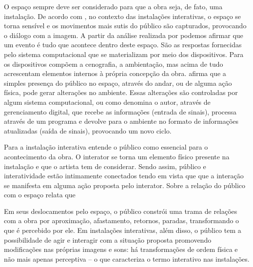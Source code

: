 O espaço sempre deve ser considerado para que a obra seja, de fato, uma instalação. De acordo com , no contexto das instalações interativas, o espaço se torna sensível e os movimentos mais sutis do público são capturados, provocando o diálogo com a imagem. A partir da análise realizada por  podemos afirmar que um evento é tudo que acontece dentro deste espaço. São as respostas fornecidas pelo sistema computacional que se materializam por meio dos dispositivos. Para  os dispositivos compõem a cenografia, a
ambientação, mas acima de tudo acrescentam elementos internos à própria concepção
da obra.  afirma que a simples presença do público no espaço, através do andar, ou de alguma ação física, pode gerar alterações no ambiente. Essas alterações são controladas por algum sistema computacional, ou como denomina o autor, através de gerenciamento digital, que recebe as informações (entrada de sinais), processa através de um programa e devolve para o ambiente no formato de informações atualizadas (saída de sinais), provocando um novo ciclo.

Para  a instalação interativa entende o público como essencial para o acontecimento da obra. O interator se torna um elemento físico presente na instalação e que o artista tem de considerar. Sendo assim, público e interatividade estão intimamente conectados tendo em vista que que a interação se manifesta em alguma ação proposta pelo interator. Sobre a relação do público com o espaço  relata que

\begin{citacao}
Em seus deslocamentos pelo espaço, o público constrói uma trama de relações com a obra por aproximação, afastamento, retornos, paradas, transformando o que é percebido por ele. Em instalações interativas, além disso, o público tem a possibilidade de agir e interagir com a situação proposta promovendo modificações nas próprias imagens e sons:  há transformações de ordem física e não mais apenas perceptiva – o que caracteriza o termo interativo nas instalações.  \cite[p. 6]{bochio}  
\end{citacao}

